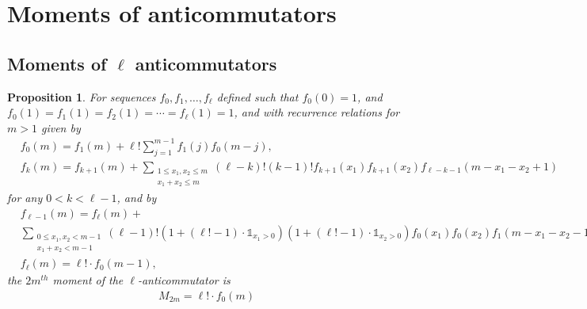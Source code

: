 \documentclass[11pt,reqno]{amsart}
\numberwithin{equation}{section}
\theoremstyle{plain}
\newtheorem{proposition}[thm]{Proposition}
\begin{document}
\appendix
\section{Moments of anticommutators}\label{AppendixMomentsAnti}
\subsection{Moments of $\ell$ anticommutators}


\begin{proposition}
For sequences $f_0,f_1,\dotsc,f_\ell$ defined such that $f_0(0)=1$, and $f_0(1)=f_1(1)=f_2(1)=\cdots=f_\ell(1)=1$, and with recurrence relations for $m>1$ given by
\begin{align}
&f_0(m)=f_1(m)+ \ell! \sum_{j=1}^{m-1}f_1(j)f_0(m-j),\nonumber\\
&f_k(m)=f_{k+1}(m)+\sum_{\substack{1\leq x_1,x_2\leq m\\ x_1+x_2\leq m}}(\ell-k)!(k-1)!f_{k+1}(x_1)f_{k+1}(x_2)f_{\ell-k-1}(m-x_1-x_2+1)
\end{align}
for any $0<k<\ell-1$, and by
\begin{align}
&f_{\ell-1}(m)=f_\ell(m)+\nonumber\\&\sum_{\substack{0\leq x_1,x_2<m-1\\ x_1+x_2<m-1}} (\ell-1)!(1+(\ell!-1)\cdot \mathbb{1}_{x_1>0})(1+(\ell!-1)\cdot \mathbb{1}_{x_2>0})f_0(x_1)f_0(x_2)f_1(m-x_1-x_2-1),\nonumber
\\
&f_\ell(m)= \ell! \cdot f_0(m-1),
\end{align}
the $2m^{th}$ moment of the $\ell$-anticommutator is 
\begin{align}
M_{2m}=\ell! \cdot f_0(m)
\end{align}
\end{proposition}
\end{document}
